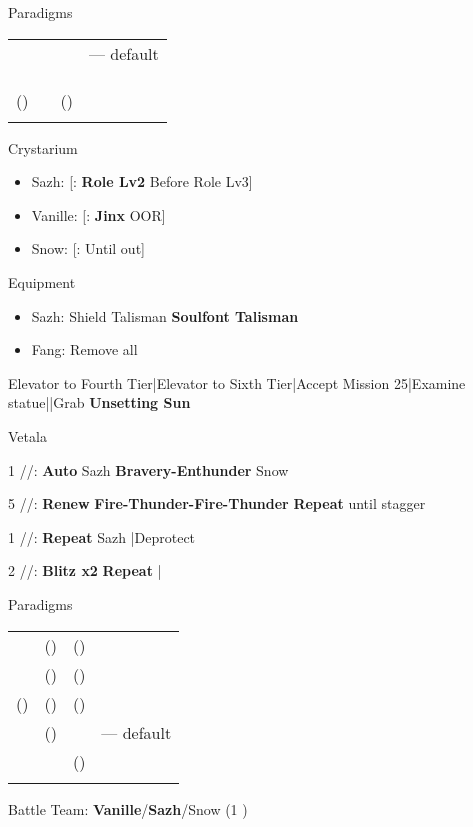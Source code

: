 \begin{menu}
	\item Paradigms
	\begin{tabular}{cccl}
		\syn   & \sab & \rav   & --- default \\
		\com   & \med & \com   &             \\
		\syn   & \med & \com   &             \\
		\com   & \sab & \com   &             \\
		(\rav) & \sab & (\rav) &             \\
		\com   & \rav & \com   &
	\end{tabular}
	\item Crystarium
	\begin{itemize}
		\item Sazh: [\rav: \textbf{Role Lv2} \to Before Role Lv3]
		\item Vanille: [\sab: \textbf{Jinx} OOR]
		\item Snow: [\sen: Until out]
	\end{itemize}
	\item Equipment
	\begin{itemize}
		\item Sazh: Shield Talisman \to \textbf{Soulfont Talisman}
		\item Fang: Remove all
	\end{itemize}
\end{menu}
\begin{mainlist}
	\item Elevator to Fourth Tier|Elevator to Sixth Tier|Accept Mission 25|Examine statue|\skip|Grab \textbf{Unsetting Sun}
\end{mainlist}
\begin{fight}{Vetala}
	\item [1] \syn/\sab/\rav: \textbf{Auto} Sazh \to \textbf{Bravery-Enthunder} Snow
	\item [5] \rav/\sab/\rav: \textbf{Renew} \to \textbf{Fire-Thunder-Fire-Thunder} \to \textbf{Repeat} until stagger
	\item [1] \syn/\sab/\rav: \textbf{Repeat} Sazh |Deprotect
	\item [2] \com/\med/\com: \textbf{Blitz x2} \to \textbf{Repeat} |\skip
\end{fight}
\begin{menu}
	\item Paradigms
	\begin{tabular}{cccl}
		\syn   & (\rav) & (\sen) &             \\
		\com   & (\rav) & (\rav) &             \\
		(\rav) & (\rav) & (\sen) &             \\
		\com   & (\rav) & \com   & --- default \\
		\rav   & \sab   & (\sen) &             \\
		\com   & \rav   & \com   &
	\end{tabular}
	\item Battle Team: \textbf{Vanille}/\textbf{Sazh}/Snow (1 )
\end{menu}
